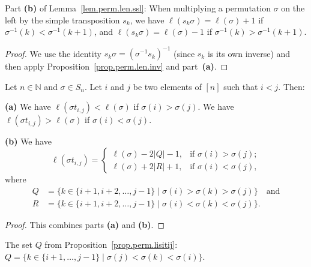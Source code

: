 \begin{theorem}
\label{lem.perm.len.ssl.b}
\leanhelper
\leanok
Part \textbf{(b)} of Lemma~\ref{lem.perm.len.ssl}: When multiplying a permutation $\sigma$
on the left by the simple transposition $s_k$, we have
$\ell(s_k \sigma) = \ell(\sigma) + 1$ if $\sigma^{-1}(k) < \sigma^{-1}(k+1)$,
and $\ell(s_k \sigma) = \ell(\sigma) - 1$ if $\sigma^{-1}(k) > \sigma^{-1}(k+1)$.
\end{theorem}

\begin{proof}
\leanok
We use the identity $s_k \sigma = (\sigma^{-1} s_k)^{-1}$
(since $s_k$ is its own inverse)
and then apply Proposition~\ref{prop.perm.len.inv} and part~\textbf{(a)}.
\end{proof}


\begin{proposition}
\label{prop.perm.lisitij}
\leantarget
\leanok
Let $n \in \mathbb{N}$ and $\sigma \in S_n$. Let $i$ and $j$ be
two elements of $[n]$ such that $i < j$. Then:
\medskip

\textbf{(a)} We have $\ell(\sigma t_{i,j}) < \ell(\sigma)$ if $\sigma(i) > \sigma(j)$.
We have $\ell(\sigma t_{i,j}) > \ell(\sigma)$ if $\sigma(i) < \sigma(j)$.
\medskip

\textbf{(b)} We have
\[
\ell(\sigma t_{i,j}) =
\begin{cases}
\ell(\sigma) - 2|Q| - 1, & \text{if } \sigma(i) > \sigma(j); \\
\ell(\sigma) + 2|R| + 1, & \text{if } \sigma(i) < \sigma(j),
\end{cases}
\]
where
\begin{align*}
Q &= \{k \in \{i+1, i+2, \ldots, j-1\} \mid \sigma(i) > \sigma(k) > \sigma(j)\}
\quad \text{and} \\
R &= \{k \in \{i+1, i+2, \ldots, j-1\} \mid \sigma(i) < \sigma(k) < \sigma(j)\}.
\end{align*}
\end{proposition}

\begin{proof}
This combines parts \textbf{(a)} and \textbf{(b)}.
\end{proof}

\begin{definition}
\label{def.perm.setQ}
\leanhelper
\leanok
The set $Q$ from Proposition~\ref{prop.perm.lisitij}:
$Q = \{k \in \{i+1, \ldots, j-1\} \mid \sigma(j) < \sigma(k) < \sigma(i)\}$.
\end{definition}

